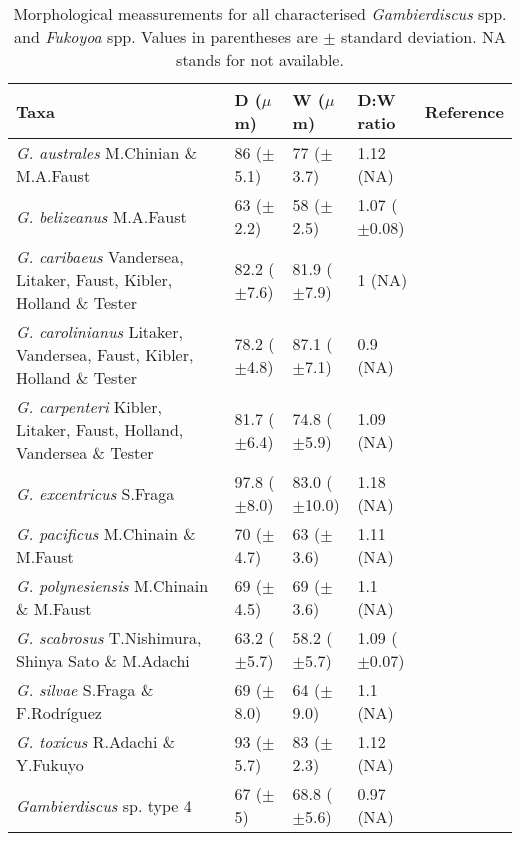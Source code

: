 \documentclass[12pt]{article}
\begin{document}
\FloatBarrier
\begin{table}
\caption{Morphological meassurements for all characterised \emph{Gambierdiscus} spp. and \emph{Fukoyoa} spp. Values in parentheses are $\pm$ standard deviation. NA stands for not available.}
\label{tbl:GlobalSizeTable}
\begin{tabular}{ | p{3.5cm} | p{2cm} | p{2cm} | p{2.5cm} | p{1.5cm}| }
\hline
\textbf{Taxa} &  \textbf{D ($\mu$m)} & \textbf{W ($\mu$m)}  & \textbf{D:W ratio} & \textbf{Reference} \\
 \hline
\textit{G. australes }M.Chinian \& M.A.Faust	& 86 ($\pm$5.1) & 77 ($\pm$3.7) & 1.12 (NA) & \citep{chinain1999morphology} \\
 \hline
 \textit{G. belizeanus }M.A.Faust	& 63 ($\pm$2.2) & 58 ($\pm$2.5) & 1.07 ($\pm$0.08) & \citep{chinain1999morphology} \\
 \hline
 \textit{G. caribaeus} Vandersea, Litaker, Faust, Kibler, Holland \& Tester	& 82.2 ($\pm$7.6)	& 81.9 ($\pm$7.9)	& 1 (NA) & \citep{litaker2009taxonomy}\\
 \hline
 \textit{G. carolinianus} Litaker, Vandersea, Faust, Kibler, Holland \& Tester & 78.2 ($\pm$4.8) & 87.1 ($\pm$7.1) & 0.9 (NA) & \citep{litaker2009taxonomy} \\
 \hline
\textit{G. carpenteri} Kibler, Litaker, Faust, Holland, Vandersea \& Tester&	81.7 ($\pm$6.4) &	74.8 ($\pm$5.9) & 1.09 (NA) & \citep{litaker2009taxonomy} \\
 \hline
\textit{G. excentricus	}S.Fraga & 97.8 ($\pm$8.0) &	83.0 ($\pm$10.0) & 1.18 (NA) & \citep{litaker2009taxonomy} \\
 \hline
\textit{G. pacificus} M.Chinain \& M.Faust& 70 ($\pm$4.7) & 63 ($\pm$3.6) & 1.11 (NA) & \citep{chinain1999morphology}\\
 \hline
\textit{G. polynesiensis} M.Chinain \& M.Faust & 69 ($\pm$4.5) & 69 ($\pm$3.6) & 1.1 (NA) &	\citep{chinain1999morphology} \\ 
 \hline
\textit{G. scabrosus} T.Nishimura, Shinya Sato \& M.Adachi	& 63.2 ($\pm$5.7) & 58.2 ($\pm$5.7) & 1.09 ($\pm$0.07) & \citep{nishimura2014morphology}\\
 \hline
 \textit{G. silvae}	S.Fraga \& F.Rodr{\'i}guez & 69 ($\pm$8.0) & 64 ($\pm$9.0) & 1.1 (NA) & \citep{fraga2014genus,litaker2010global}\\
 \hline
\textit{G. toxicus} R.Adachi \& Y.Fukuyo & 93 ($\pm$5.7) & 83 ($\pm$2.3) & 1.12 (NA) & \citep{litaker2009taxonomy}\\
 \hline
 \emph{Gambierdiscus} sp. type 4	& 67 ($\pm$5) & 68.8 ($\pm$5.6) & 0.97 (NA) & \citep{xu2014distribution} \\

\end{tabular}
\end{table}
\end{document}
